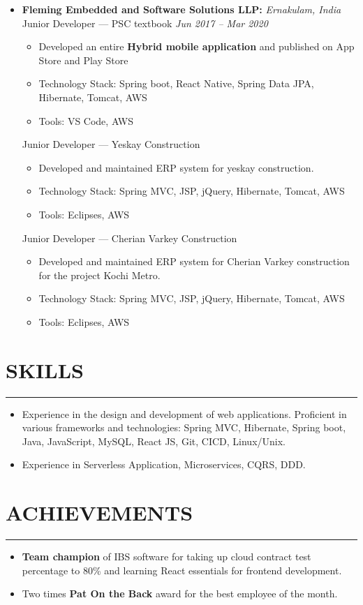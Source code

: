 \documentclass{article}
\begin{document}
		\begin{itemize}
			\item \textbf{Fleming Embedded and Software Solutions LLP:} \hfill \textit{Ernakulam, India} \newline Junior Developer — PSC textbook \hfill \textit{Jun 2017 – Mar 2020}
			\begin{itemize}
				\item Developed an entire \textbf{Hybrid mobile application} and published on App Store and Play Store			
				\item Technology Stack: Spring boot, React Native, Spring Data JPA, Hibernate, Tomcat, AWS
				\item Tools: VS Code, AWS
			\end{itemize}
			Junior Developer — Yeskay Construction
			\begin{itemize}
				\item	Developed and maintained ERP system for yeskay construction.
				\item Technology Stack: Spring MVC, JSP, jQuery, Hibernate, Tomcat, AWS
				\item Tools: Eclipses, AWS
			\end{itemize}
			Junior Developer — Cherian Varkey Construction
			\begin{itemize}
				\item Developed and maintained ERP system for Cherian Varkey construction for the project Kochi Metro.
				\item Technology Stack: Spring MVC, JSP, jQuery, Hibernate, Tomcat, AWS
				\item Tools: Eclipses, AWS
			\end{itemize}
		\end{itemize}
	\section*{\normalsize SKILLS}
	\rule{\textwidth}{1.6pt}
		\begin{itemize}
			\item Experience in the design and development of web applications. Proficient in various frameworks and technologies: Spring MVC, Hibernate, Spring boot, Java, JavaScript, MySQL, React JS, Git, CICD, Linux/Unix.
			\item Experience in Serverless Application, Microservices, CQRS, DDD.
		\end{itemize}
	\section*{\normalsize ACHIEVEMENTS}
	\rule{\textwidth}{1.6pt}
		\begin{itemize}
			\item \textbf{Team champion} of IBS software for taking up cloud contract test percentage to 80\% and learning React essentials for frontend development.
			\item Two times \textbf{Pat On the Back} award for the best employee of the month.
		\end{itemize}
\end{document}
